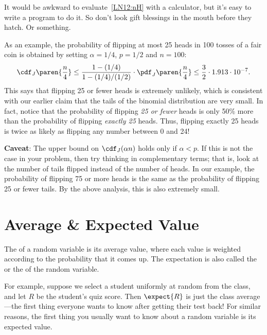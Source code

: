It would be awkward to evaluate~\eqref{LN12:nH} with a calculator, but it's
easy to write a program to do it.  So don't look gift blessings in the
mouth before they hatch.  Or something.

As an example, the probability of flipping at most 25 heads in 100
tosses of a fair coin is obtained by setting $\alpha = 1/4$, $p = 1/2$
and $n = 100$:
%
\[
\cdf_J\paren{\frac{n}{4}} \leq \frac{1 - (1/4)}{1 - (1/4) / (1/2)}
                             \cdot \pdf_J\paren{\frac{n}{4}}
                    \leq \frac{3}{2} \cdot 1.913 \cdot 10^{-7}.
\]
%
This says that flipping 25 or fewer heads is extremely unlikely, which
is consistent with our earlier claim that the tails of the binomial
distribution are very small.  In fact, notice that the probability of
flipping \textit{25 or fewer} heads is only 50\% more than the
probability of flipping \textit{exactly 25} heads.  Thus, flipping
exactly 25 heads is twice as likely as flipping any number between 0
and 24!  

\noindent \textbf{Caveat}: The upper bound on $\cdf_J(\alpha n)$ holds
only if $\alpha < p$.  If this is not the case in your problem, then
try thinking in complementary terms; that is, look at the number of
tails flipped instead of the number of heads.  In our example,
the probability of flipping 75 or more heads is the same as
the probability of flipping 25 or fewer tails.  By the above
analysis, this is also extremely small.



\section{Average \& Expected Value}
The  of a random variable is its average value, where
each value is weighted according to the probability that it comes up.
The expectation is also called the  or the
 of the random variable.

For example, suppose we select a student uniformly at random from the
class, and let $R$ be the student's quiz score.  Then $\expect{R}$ is just
the class average ---the first thing everyone wants to know after getting
their test back!  For similar reasons, the first thing you usually want to
know about a random variable is its expected value.


